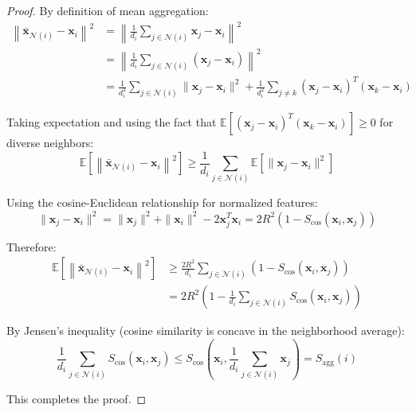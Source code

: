 \begin{proof}
By definition of mean aggregation:
\begin{align}
\left\|\bar{\mathbf{x}}_{\mathcal{N}(i)} - \mathbf{x}_i\right\|^2 &= \left\|\frac{1}{d_i}\sum_{j \in \mathcal{N}(i)} \mathbf{x}_j - \mathbf{x}_i\right\|^2 \\
&= \left\|\frac{1}{d_i}\sum_{j \in \mathcal{N}(i)} (\mathbf{x}_j - \mathbf{x}_i)\right\|^2 \\
&= \frac{1}{d_i^2}\sum_{j \in \mathcal{N}(i)}\|\mathbf{x}_j - \mathbf{x}_i\|^2 + \frac{1}{d_i^2}\sum_{j \neq k} (\mathbf{x}_j - \mathbf{x}_i)^T(\mathbf{x}_k - \mathbf{x}_i)
\end{align}

Taking expectation and using the fact that $\mathbb{E}[(\mathbf{x}_j - \mathbf{x}_i)^T(\mathbf{x}_k - \mathbf{x}_i)] \geq 0$ for diverse neighbors:
\begin{equation}
\mathbb{E}\left[\left\|\bar{\mathbf{x}}_{\mathcal{N}(i)} - \mathbf{x}_i\right\|^2\right] \geq \frac{1}{d_i}\sum_{j \in \mathcal{N}(i)} \mathbb{E}\left[\|\mathbf{x}_j - \mathbf{x}_i\|^2\right]
\end{equation}

Using the cosine-Euclidean relationship for normalized features:
\begin{equation}
\|\mathbf{x}_j - \mathbf{x}_i\|^2 = \|\mathbf{x}_j\|^2 + \|\mathbf{x}_i\|^2 - 2\mathbf{x}_j^T\mathbf{x}_i = 2R^2(1 - S_{\cos}(\mathbf{x}_i, \mathbf{x}_j))
\end{equation}

Therefore:
\begin{align}
\mathbb{E}\left[\left\|\bar{\mathbf{x}}_{\mathcal{N}(i)} - \mathbf{x}_i\right\|^2\right] &\geq \frac{2R^2}{d_i}\sum_{j \in \mathcal{N}(i)} (1 - S_{\cos}(\mathbf{x}_i, \mathbf{x}_j)) \\
&= 2R^2 \left(1 - \frac{1}{d_i}\sum_{j \in \mathcal{N}(i)} S_{\cos}(\mathbf{x}_i, \mathbf{x}_j)\right)
\end{align}

By Jensen's inequality (cosine similarity is concave in the neighborhood average):
\begin{equation}
\frac{1}{d_i}\sum_{j \in \mathcal{N}(i)} S_{\cos}(\mathbf{x}_i, \mathbf{x}_j) \leq S_{\cos}\left(\mathbf{x}_i, \frac{1}{d_i}\sum_{j \in \mathcal{N}(i)} \mathbf{x}_j\right) = S_{\text{agg}}(i)
\end{equation}

This completes the proof.
\end{proof}

